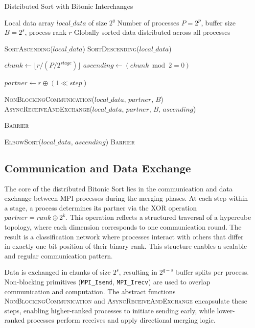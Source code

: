 \documentclass{article}
\begin{document}
\begin{algorithm}[H]
\caption{Distributed Sort with Bitonic Interchanges}
\begin{algorithmic}[1]
\REQUIRE Local data array $local\_data$ of size $2^q$
\REQUIRE Number of processes $P = 2^p$, buffer size $B = 2^s$, process rank $r$
\ENSURE Globally sorted data distributed across all processes

    \STATE \textsc{SortAscending}($local\_data$)
\ELSE
    \STATE \textsc{SortDescending}($local\_data$)
\ENDIF

    \STATE $chunk \gets \lfloor r / (P / 2^{stage}) \rfloor$
    \STATE $ascending \gets (chunk \bmod 2 = 0)$

        \STATE $partner \gets r \oplus (1 \ll step)$

            \STATE \textsc{NonBlockingCommunication}($local\_data$, $partner$, $B$)
        \ELSE
            \STATE \textsc{AsyncReceiveAndExchange}($local\_data$, $partner$, $B$, $ascending$)
        \ENDIF

        \STATE \textsc{Barrier}
    \ENDFOR

    \STATE \textsc{ElbowSort}($local\_data$, $ascending$)
    \STATE \textsc{Barrier}
\ENDFOR

\end{algorithmic}
\end{algorithm}

\subsection{Communication and Data Exchange}

The core of the distributed Bitonic Sort lies in the communication and data exchange between MPI processes 
during the merging phases. At each step within a stage, a process determines its partner via the XOR 
operation $partner = rank \oplus 2^k$. This operation reflects a structured traversal of a hypercube topology, 
where each dimension corresponds to one communication round. The result is a classification network where 
processes interact with others that differ in exactly one bit position of their binary rank. This structure 
enables a scalable and regular communication pattern.

Data is exchanged in chunks of size $2^s$, resulting in $2^{q-s}$ buffer splits per process. Non-blocking 
primitives (\texttt{MPI\_Isend}, \texttt{MPI\_Irecv}) are used to overlap communication and computation. 
The abstract functions \textsc{NonBlockingCommunication} and \textsc{AsyncReceiveAndExchange} encapsulate 
these steps, enabling higher-ranked processes to initiate sending early, while lower-ranked processes perform 
receives and apply directional merging logic.
\end{document}
